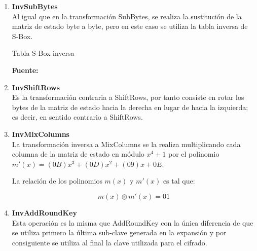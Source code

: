 \documentclass[../main/main.tex]{subfiles}
\begin{document}
      \begin{enumerate}[label=\textbf{\arabic*}.]
        \item \textbf{InvSubBytes} \\
          Al igual que en la transformación SubBytes, se realiza la sustitución de la matriz de estado byte a byte, pero en este caso se utiliza la tabla inversa de S-Box.

          \begin{table}[H]
            \scriptsize
            \centering
            \caption{Tabla S-Box inversa}
            
            \caption*{\textbf{Fuente:} \cite{report:seguridad_europea_eeuu}}
          \end{table}
        
        \item \textbf{InvShiftRows} \\
          Es la transformación contraria a ShiftRows, por tanto consiste en rotar los bytes de la matriz de estado hacia la derecha en lugar de hacia la izquierda; es decir, en sentido contrario a ShiftRows.

          \begin{table}[H]
            \centering
            
          \end{table}

        \item \textbf{InvMixColumns} \\
          La transformación inversa a MixColumns se la realiza multiplicando cada columna de la matriz de estado en módulo $x^4 + 1$ por el polinomio $m'(x) = (0B)x^3 + (0D)x^2 + (09)x + 0E$.

          La relación de los polinomios $m(x)$ y $m'(x)$ es tal que:

          \vspace{-0.7cm}\begin{equation}
            m(x) \otimes m'(x) = 01
          \end{equation}

        \item \textbf{InvAddRoundKey} \\
          Esta operación es la misma que AddRoundKey con la única diferencia de que se utiliza primero la última sub-clave generada en la expansión y por consiguiente se utiliza al final la clave utilizada para el cifrado.
      \end{enumerate}
  
\end{document}
